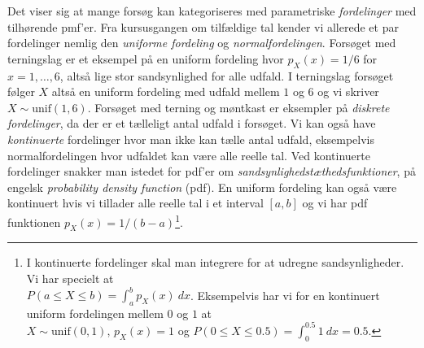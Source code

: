 \documentclass{article}
\begin{document}
Det viser sig at mange forsøg kan kategoriseres med parametriske \textit{fordelinger} med tilhørende pmf'er. Fra kursusgangen om tilfældige tal kender vi allerede et par fordelinger nemlig den \textit{uniforme fordeling}  og \textit{normalfordelingen}. Forsøget med terningslag er et eksempel på en uniform fordeling hvor $p_X(x) = 1/6$ for $x = 1,\dots, 6$, altså lige stor sandsynlighed for alle udfald. I terningslag forsøget følger $X$ altså en uniform fordeling med udfald mellem $1$ og $6$ og vi skriver $X \sim \text{unif}(1,6)$. Forsøget med terning og møntkast er eksempler på \textit{diskrete fordelinger}, da der er et tælleligt antal udfald i forsøget. Vi kan også have \textit{kontinuerte} fordelinger hvor man ikke kan tælle antal udfald, eksempelvis normalfordelingen hvor udfaldet kan være alle reelle tal. Ved kontinuerte fordelinger snakker man istedet for pdf'er om \textit{sandsynlighedstæthedsfunktioner}, på engelsk \textit{probability density function} (pdf). En uniform fordeling kan også være kontinuert hvis vi tillader alle reelle tal i et interval $[a,b]$ og vi har pdf funktionen $p_X(x) = 1/(b-a)$\footnote{I kontinuerte fordelinger skal man integrere for at udregne sandsynligheder. Vi har specielt at \\
 $P(a \leq X \leq b) = \int_a^b p_X(x)\ dx$. Eksempelvis har vi for en kontinuert uniform fordelingen mellem $0$ og $1$ at\\ $X \sim \text{unif}(0,1)$, $p_X(x) = 1$ og $P(0 \leq X \leq 0.5) = \int_0^{0.5} 1 \ dx = 0.5$.}.
% 
\end{document}
